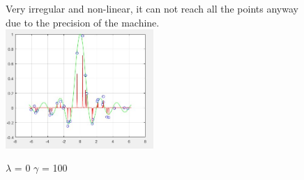 \begin{figure}
	
Very irregular and non-linear, it can not reach all the points anyway due to the precision of the machine.\\

	
	\includegraphics[width=0.5\textwidth]{kml100g0.png}
	\centering
	\caption{$\lambda$ = 0 $\gamma$ = 100}
\end{figure}


